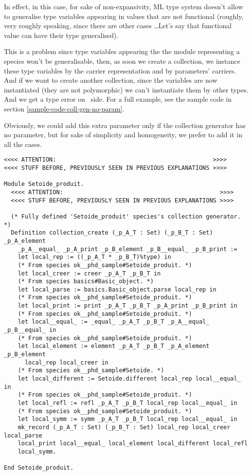 In effect, in this case, for sake of non-expansivity, ML type system
doesn't allow to generalise type variables appearing in values that
are not functional (roughly, very roughly speaking, since there are
other cases \ldots Let's say that functional value can have their
type generalised).

This is a problem since type variables appearing the the module
representing a species won't be generalisable, then, as soon we create
a collection, we instance these type variables by the carrier
representation and by parameters' carriers. And if we want to create
another collection, since the variables are now instantiated (they are
not polymorphic) we can't instantiate them by other types. And we get
a type error on \ocaml\ side. For a full example, see the sample code
in section \ref{sample-code-coll-gen-no-param}.

Obviously, we could add this extra parameter only if the collection
generator has no parameter, but for sake of simplicity and
homogeneity, we prefer to add it in all the cases.


{\footnotesize
\begin{lstlisting}[language=MyCoq]
<<<< ATTENTION:                                             >>>>
<<<< STUFF BEFORE, PREVIOUSLY SEEN IN PREVIOUS EXPLANATIONS >>>>

Module Setoide_produit.
  <<<< ATTENTION:                                             >>>>
  <<<< STUFF BEFORE, PREVIOUSLY SEEN IN PREVIOUS EXPLANATIONS >>>>

  (* Fully defined 'Setoide_produit' species's collection generator. *)
  Definition collection_create (_p_A_T : Set) (_p_B_T : Set) _p_A_element
    _p_A__equal_ _p_A_print _p_B_element _p_B__equal_ _p_B_print :=
    let local_rep := ((_p_A_T * _p_B_T)%type) in
    (* From species ok__phd_sample#Setoide_produit. *)
    let local_creer := creer _p_A_T _p_B_T in
    (* From species basics#Basic_object. *)
    let local_parse := basics.Basic_object.parse local_rep in
    (* From species ok__phd_sample#Setoide_produit. *)
    let local_print := print _p_A_T _p_B_T _p_A_print _p_B_print in
    (* From species ok__phd_sample#Setoide_produit. *)
    let local__equal_ := _equal_ _p_A_T _p_B_T _p_A__equal_ _p_B__equal_ in
    (* From species ok__phd_sample#Setoide_produit. *)
    let local_element := element _p_A_T _p_B_T _p_A_element _p_B_element
      local_rep local_creer in
    (* From species ok__phd_sample#Setoide. *)
    let local_different := Setoide.different local_rep local__equal_ in
    (* From species ok__phd_sample#Setoide_produit. *)
    let local_refl := refl _p_A_T _p_B_T local_rep local__equal_ in
    (* From species ok__phd_sample#Setoide_produit. *)
    let local_symm := symm _p_A_T _p_B_T local_rep local__equal_ in
    mk_record (_p_A_T : Set) (_p_B_T : Set) local_rep local_creer local_parse
    local_print local__equal_ local_element local_different local_refl
    local_symm.
  
End Setoide_produit.
\end{lstlisting}
}

